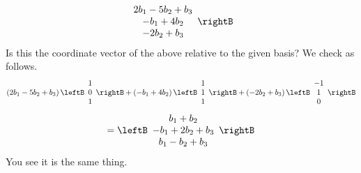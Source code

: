 \begin{solution}
\begin{equation*}
\begin{array}{c}
2b_1-5b_2+b_3 \\ 
-b_1 + 4b_2 \\ 
-2b_2 + b_3
\end{array}
\rightB
\end{equation*}
Is this the coordinate vector of the above relative to the given basis? We check as follows. 
\begin{equation*}
\left( 2b_1-5b_2+b_3\right) \leftB 
\begin{array}{c}
1 \\ 
0 \\ 
1
\end{array}
\rightB +\left( -b_1 + 4b_2\right) \leftB 
\begin{array}{c}
1 \\ 
1 \\ 
1
\end{array}
\rightB +\left( -2b_2+b_3\right) \leftB 
\begin{array}{c}
-1 \\ 
1 \\ 
0
\end{array}
\rightB
\end{equation*}
\begin{equation*}
= \leftB 
\begin{array}{c}
b_1+b_2 \\ 
-b_1 + 2b_2+b_3 \\ 
b_1-b_2+b_3
\end{array}
\rightB
\end{equation*}
You see it is the same thing.


\end{solution}
